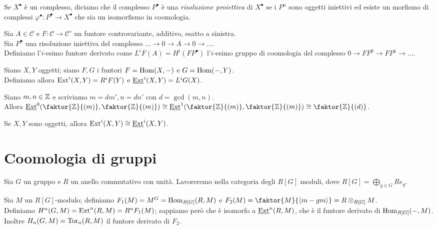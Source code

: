 \begin{definition}
    Se $X^\bullet$ è un complesso, diciamo che il complesso $P^\bullet$ è una \emph{risoluzione proiettiva} di $X^\bullet$ se i $P^n$ sono oggetti iniettivi ed esiste un morfismo di complessi $\varphi^\bullet:P^\bullet\to X^\bullet$ che sia un isomorfismo in coomologia.
\end{definition}

\begin{definition}
    Sia $A\in\mathcal C$ e $F:\mathcal C\to\mathcal C'$ un funtore controvariante, additivo, esatto a sinistra.\\
    Sia $P^\bullet$ una risoluzione iniettiva del complesso $\dots\to0\to A\to0\to\dots$.\\
    Definiamo l'$i$-esimo funtore derivato come $L^iF(A)=H^i(FP^\bullet)$ l'$i$-esimo gruppo di coomologia del complesso $0\to FP^0\to FP^1\to\dots$.
\end{definition}

\begin{definition}
    Siano $X,Y$ oggetti; siano $F,G$ i funtori $F=\operatorname{Hom}(X,-)$ e $G=\operatorname{Hom}(-,Y)$.\\
    Definiamo allora $\operatorname{Ext}^i(X,Y)=R^iF(Y)$ e $\underline{\operatorname{Ext}}^i(X,Y)=L^iG(X)$.
\end{definition}

\begin{example}
    Siano $m,n\in\mathbb{Z}$ e scriviamo $m=dm',n=dn'$ con $d=\gcd(m,n)$.\\
    Allora $\underline{\Ext}^0(\faktor{\Z}{(m)}, \faktor{\Z}{(m)})\cong \underline{\Ext}^1(\faktor{\Z}{(m)}, \faktor{\Z}{(m)})\cong \faktor{\Z}{(d)}$.
\end{example}

\begin{proposition}
    Se $X,Y$ sono oggetti, allora $\operatorname{Ext}^i(X,Y)\cong\underline{\operatorname{Ext}}^i(X,Y)$.
\end{proposition}

\section{Coomologia di gruppi}

Sia $G$ un gruppo e $R$ un anello commutativo con unità. Lavoreremo nella categoria degli $R[G]$ moduli, dove $R[G]=\bigoplus_{g\in G}Re_g$.

\begin{definition}
    Sia $M$ un $R[G]$-modulo; definiamo $F_1(M)=M^G=\operatorname{Hom}_{R[G]}(R,M)$ e $F_2(M)=\faktor{M}{\langle m-gm \rangle}=R\otimes_{R[G]}M$.\\
    Definiamo $H^n(G,M)=\operatorname{Ext}^n(R,M)=R^nF_1(M)$; sappiamo però che è isomorfo a $\underline{\operatorname{Ext}}^n(R,M)$, che è il funtore derivato di $\operatorname{Hom}_{R[G]}(-,M)$.\\
    Inoltre $H_n(G,M)=\operatorname{Tor}_n(R,M)$ il funtore derivato di $F_2$.
\end{definition}

